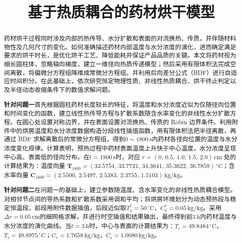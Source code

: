 \documentclass[12pt,a4paper,fontset=none]{ctexart}
\title{\vspace{-2.2em}\bfseries 基于热质耦合的药材烘干模型}
\author{}
\date{}
\newcommand{\problem}[1]{\par\noindent\hspace*{2em}\textbf{针对问题#1}\quad}
\begin{document}
\maketitle
\vspace{-5em}

\begin{abstract}
\footnotesize
{}
药材烘干过程同时涉及内部的热传导、水分扩散和表面的对流换热、传质，并伴随材料物性及几何尺寸的变化。如何准确描述药材内部温度与水分浓度的演化，进而确定满足要求的烘干时长，是优化烘干工艺、降低能耗并保证产品品质的关键。本文将药材视为细长圆柱体，忽略轴向梯度，建立一维径向热质传递模型；然后采用有限体积法完成空间离散，将偏微分方程组降维成常微分方程组，并利用后向差分公式（BDF）进行自适应时间积分。在此基础上，依次研究恒定物理性质、非线性热质耦合、烘干终止判定以及半径动态收缩条件下的数值求解问题。

\problem{一}首先根据圆柱药材长度较长的特征，将温度和水分浓度近似为仅随径向位置和时间变化的函数，建立线性热传导方程与扩散系数随含水率变化的非线性水分扩散方程。在圆心处设置对称边界，并在表面设置对流换热、传质的 Robin 边界条件。利用附件中的烘房温度和水分浓度数据构造分段线性插值函数，用有限体积法把半径离散，再通过 BDF 求解离散后的常微分方程组，得到\textbf{\boldmath$0\sim1800\,\mathrm{s}$}内药材各径向位置的温度与水分浓度变化规律。计算表明，预热过程中药材表面温度上升快于中心温度，水分浓度呈现中心高、表面低的径向分布。在\textbf{\boldmath$t=1800\,\mathrm{s}$}时，对应 $r=(0,\,0.5,\,1.0,\,1.5,\,2.0)\,\mathrm{cm}$ 处的计算结果为：温度向量 \textbf{\boldmath$\bm T_{1800}=(33.5754,\allowbreak\, 33.7721,\allowbreak\, 34.3641,\allowbreak\, 35.3622,\allowbreak\, 36.7859)\,{}^\circ\mathrm C$}；含水率向量 \textbf{\boldmath$\bm C_{1800}=(2.5500,\allowbreak\, 2.5497,\allowbreak\, 2.5383,\allowbreak\, 2.3755,\allowbreak\, 1.5103)\,\mathrm{kg/kg}$}。

\problem{二}在问题一的基础上，建立参数随温度、含水率变化的非线性热质耦合模型。对相邻节点间的导热系数和扩散系数采用调和平均；将烘房环境划分为动态预热段与稳定恒温段，前段用附件数据插值，后段近似取\textbf{\boldmath$T_a^*=50\,{}^\circ\mathrm C$}、\textbf{\boldmath$C_a^*=0.05\,\mathrm{kg/kg}$}。采用\textbf{\boldmath$\Delta r=0.05\,\mathrm{cm}$}的细网格求解，并进行时空插值和结果输出，最终得到前\textbf{\boldmath$3\,\mathrm h$}内药材温度与水分浓度的演化曲线。当\textbf{\boldmath$t=3\,\mathrm h$}时，中心与表面的计算结果为：\textbf{\boldmath$T_{\mathrm c}=49.8484\,{}^\circ\mathrm C$}，\textbf{\boldmath$T_{\mathrm s}=49.8975\,{}^\circ\mathrm C$}；\textbf{\boldmath$C_{\mathrm c}=1.7658\,\mathrm{kg/kg}$}，\textbf{\boldmath$C_{\mathrm s}=1.0080\,\mathrm{kg/kg}$}。


\end{abstract}
\end{document}
